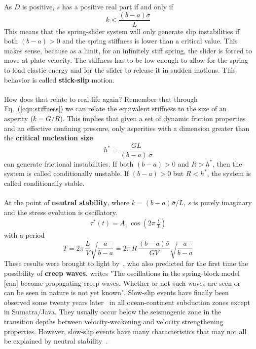 \documentclass[letterpaper,12pt,]{memoir}
\begin{document}
As $D$ is positive, $s$ has a positive real part if and only if
\begin{equation}
k<\frac{(b-a)\bar{\sigma}}{L}
\end{equation}
This means that the spring-slider system will only generate slip instabilities if both $(b-a)>0$ and the spring stiffness is lower than a critical value. This makes sense, because as a limit, for an infinitely stiff spring, the slider is forced to move at plate velocity. The stiffness has to be low enough to allow for the spring to load elastic energy and for the slider to release it in sudden motions. This behavior is called \textbf{stick-slip} motion.\\
\\
How does that relate to real life again? Remember that through Eq.~(\ref{eqn:stiffness}) we can relate the equivalent stiffness to the size of an asperity ($k=G/R$). This implies that given a set of dynamic friction properties and an effective confining pressure, only asperities with a dimension greater than the \textbf{critical nucleation size}
%
\begin{equation}
\boxed{h^*=\frac{GL}{(b-a)\,\bar{\sigma}}}
\end{equation}
%
can generate frictional instabilities. If both $(b-a)>0$ and $R>h^*$, then the system is called conditionally unstable. If $(b-a)>0$ but $R<h^*$, the system is called conditionally stable.\\
\\
At the point of \textbf{neutral stability}, where $k=(b-a)\bar{\sigma}/L$, $s$ is purely imaginary and the stress evolution is oscillatory. 
\begin{equation}
\begin{aligned}
\tau^*(t)=A_1\,\cos\left(2\pi\,\frac{t}{T}\right)
\end{aligned}
\end{equation}
with a period
\begin{equation}
T=2\pi\,\frac{L}{V}\sqrt{\frac{a}{b-a}}=2\pi \,R\,\frac{(b-a)\bar{\sigma}}{G V}\sqrt{\frac{a}{b-a}}
\end{equation}
These results were brought to light by~\cite{ruina80,ruina83}, who also predicted for the first time the possibility of \textbf{creep waves}. \cite{ruina80} writes "The oscillations in the spring-block model [can] become propagating creep waves. Whether or not such waves are seen or can be seen in nature is not yet known". Slow-slip events have finally been observed some twenty years later~\citep{rogers&dragert03,schwartz&rokosky07,ito+07,vergnolle+10} in all ocean-continent subduction zones except in Sumatra/Java. They usually occur below the seismogenic zone in the transition depths between velocity-weakening and velocity strengthening properties. However, slow-slip events have many characteristics that may not all be explained by neutral stability~\citep{rubin08,rubin11}.
\end{document}
